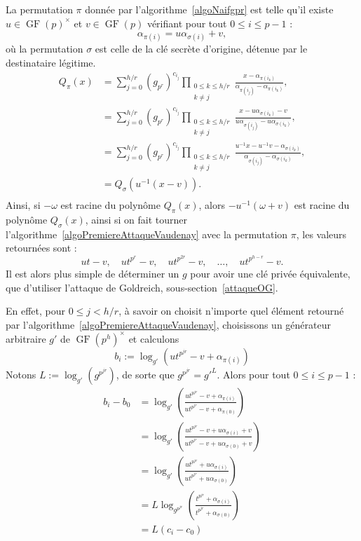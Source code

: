 \documentclass[a4paper, titlepage]{article}
\theoremstyle{definition}
\theoremstyle{remark}
\def\gf{\operatorname{GF}}
\begin{document}
La permutation $\pi$ donnée par l'algorithme~\ref{algoNaifgpr} est telle qu'il existe $u \in \gf(p)^\times$ et $v \in \gf(p)$ vérifiant pour tout $0 \leqslant i \leqslant p-1$ :
$$\alpha_{\pi(i)} = u \alpha_{\sigma(i)} + v,$$
où la permutation $\sigma$ est celle de la clé secrète d'origine, détenue par le destinataire légitime.
\begin{align*}
Q_\pi(x) &= \sum_{j=0}^{h/r} (g_{p^r})^{c_{i_j}} \prod_{\substack{0\leqslant k\leqslant h/r \\ k \neq j}}\frac{x-\alpha_{\pi(i_k)}}{\alpha_{\pi(i_j)}-\alpha_{\pi(i_k)}}, \\
&= \sum_{j=0}^{h/r} (g_{p^r})^{c_{i_j}} \prod_{\substack{0\leqslant k\leqslant h/r \\ k \neq j}}\frac{x-u\alpha_{\sigma(i_k)} - v}{u\alpha_{\sigma(i_j)}-u\alpha_{\sigma(i_k)}}, \\
&= \sum_{j=0}^{h/r} (g_{p^r})^{c_{i_j}} \prod_{\substack{0\leqslant k\leqslant h/r \\ k \neq j}}\frac{u^{-1}x - u^{-1}v-\alpha_{\sigma(i_k)}}{\alpha_{\sigma(i_j)}-\alpha_{\sigma(i_k)}}, \\
&= Q_\sigma(u^{-1}(x -v)). \\
\end{align*}
Ainsi, si $-\omega$ est racine du polynôme $Q_\pi(x)$, alors $-u^{-1}(\omega +v)$ est racine du polynôme $Q_\sigma(x)$, ainsi si on fait tourner l'algorithme~\ref{algoPremiereAttaqueVaudenay} avec la permutation $\pi$, les valeurs retournées sont :
$$u t -v,\quad u t^{p^r} -v,\quad u t^{p^{2r}} -v,\quad \dots,\quad u t^{p^{h - r}} -v.$$
Il est alors plus simple de déterminer un $g$ pour avoir une clé privée équivalente, que d'utiliser l'attaque de Goldreich, sous-section~\ref{attaqueOG}.

En effet, pour $0 \leqslant j < h/r$, à savoir on choisit n'importe quel élément retourné par l'algorithme~\ref{algoPremiereAttaqueVaudenay}, choisissons un générateur arbitraire $g'$ de $\gf(p^h)^\times$ et calculons $$b_i := \log_{g'}\left(u t^{p^{jr}} -v+\alpha_{\pi(i)}\right)$$
Notons $L := \log_{g'}(g^{p^{jr}})$, de sorte que $g^{p^{jr}}=g'^L$. Alors pour tout $0 \leqslant i \leqslant p-1$ :
\begin{align*}
b_i - b_0 &= \log_{g'}\left(\frac{u t^{p^{jr}} -v + \alpha_{\pi(i)}}{u t^{p^{jr}} -v + \alpha_{\pi(0)}}\right) \\
&= \log_{g'}\left(\frac{u t^{p^{jr}} -v + u \alpha_{\sigma(i)}+v}{u t^{p^{jr}} -v + u \alpha_{\sigma(0)}+v}\right)\\
&= \log_{g'}\left(\frac{u t^{p^{jr}} + u \alpha_{\sigma(i)}}{u t^{p^{jr}} + u \alpha_{\sigma(0)}}\right)\\
&= L\log_{g^{p^{jr}}}\left(\frac{t^{p^{jr}} + \alpha_{\sigma(i)}}{t^{p^{jr}} + \alpha_{\sigma(0)}}\right)\\
&= L(c_i - c_0) \\
\end{align*}
\end{document}
